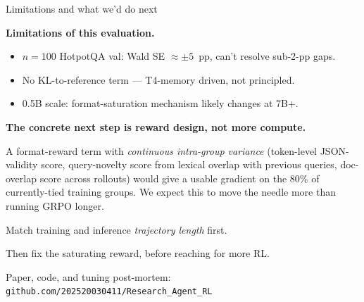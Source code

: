\documentclass[aspectratio=169]{beamer}
\begin{document}
\begin{frame}{Limitations and what we'd do next}

\textbf{Limitations of this evaluation.}
\begin{itemize}
  \item $n{=}100$ HotpotQA val: Wald SE $\approx \pm 5$~pp, can't resolve sub-2-pp gaps.
  \item No KL-to-reference term --- T4-memory driven, not principled.
  \item 0.5B scale: format-saturation mechanism likely changes at 7B+.
\end{itemize}

\vspace{0.6em}

\textbf{The concrete next step is reward design, not more compute.}

A format-reward term with \emph{continuous intra-group variance}
(token-level JSON-validity score, query-novelty score from lexical
overlap with previous queries, doc-overlap score across rollouts)
would give a usable gradient on the 80\% of currently-tied
training groups. We expect this to move the needle more than
running GRPO longer.

\end{frame}

\begin{frame}[standout]
Match training and inference \emph{trajectory length} first.

\vspace{0.7em}

Then fix the saturating reward, before reaching for more RL.

\vspace{1.2em}

{\small Paper, code, and tuning post-mortem:\\
\texttt{github.com/202520030411/Research\_Agent\_RL}}

\end{frame}
\end{document}
